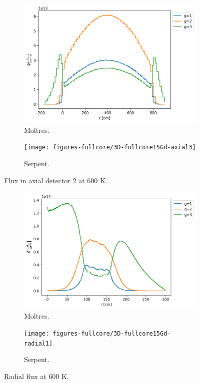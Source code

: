 \documentclass[11pt,letterpaper]{article}
\begin{document}
\begin{figure}[htbp!]
	\centering
	\begin{subfigure}[t]{0.4\textwidth}
		\centering
		\includegraphics[width=\linewidth]{figures-fullcore/serpent26G-600-collapse-Axial2}
		\caption{Moltres.}
	\end{subfigure}
	\begin{subfigure}[t]{0.4\textwidth}
		\centering
		\texttt{[image: figures-fullcore/3D-fullcore15Gd-axial3]}
		\caption{Serpent.}
	\end{subfigure}
	\hfill
	\caption{Flux in axial detector 2 at 600 K.}
	\label{fig:fullcore-axial2}
\end{figure}

\begin{figure}[htbp!]
	\centering
	\begin{subfigure}[t]{0.4\textwidth}
		\centering
		\includegraphics[width=\linewidth]{figures-fullcore/serpent26G-600-collapse-Radial}
		\caption{Moltres.}
	\end{subfigure}
	\begin{subfigure}[t]{0.4\textwidth}
		\centering
		\texttt{[image: figures-fullcore/3D-fullcore15Gd-radial1]}
		\caption{Serpent.}
	\end{subfigure}
	\hfill
	\caption{Radial flux at 600 K.}
	\label{fig:fullcore-radial1}
\end{figure}

\pagebreak


\end{document}
